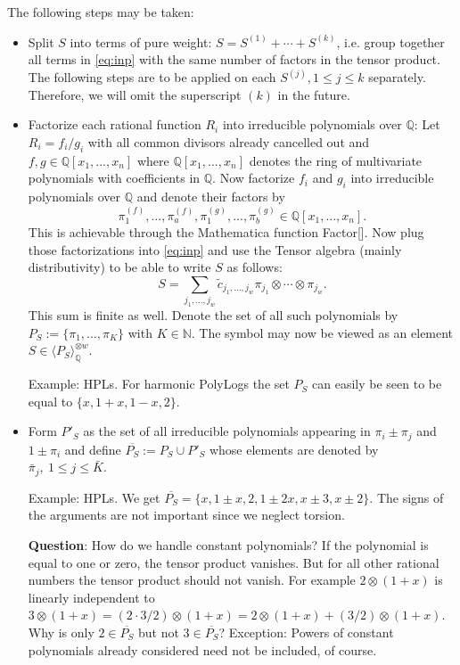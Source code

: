 \documentclass[10pt]{article}
\newcommand*{\IQ}{\mathbb{Q}}
\newcommand*{\IN}{\mathbb{N}}
\begin{document}
The following steps may be taken:
\begin{itemize}
\item[(i)] Split $S$ into terms of pure weight: $S = S^{(1)} + \cdots + S^{(k)}$, i.e. group together all terms in \ref{eq:inp} with the same number of factors in the tensor product. The following steps are to be applied on each $S^{(j)}, 1 \leq j \leq k$ separately. Therefore, we will omit the superscript $(k)$ in the future.
\item[(ii)] Factorize each rational function $R_i$ into irreducible polynomials over $\IQ$: Let $R_i = f_i/g_i$ with all common divisors already cancelled out and $f, g \in \IQ[x_1, ..., x_n]$ where $\IQ[x_1, ..., x_n]$ denotes the ring of multivariate polynomials with coefficients in $\IQ$. Now factorize $f_i$ and $g_i$ into irreducible polynomials over $\IQ$ and denote their factors by
\begin{equation*}
\pi^{(f)}_1, ..., \pi^{(f)}_a, \pi^{(g)}_1, ..., \pi^{(g)}_b \in \IQ[x_1, ..., x_n].
\end{equation*} 
This is achievable through the Mathematica function Factor[]. Now plug those factorizations into \ref{eq:inp} and use the Tensor algebra (mainly distributivity) to be able to write $S$ as follows:
\begin{equation*}
S = \sum_{j_1, ..., j_w} \tilde{c}_{j_1, ..., j_w} \pi_{j_1} \otimes \cdots \otimes \pi_{j_w}.
\end{equation*}
This sum is finite as well. Denote the set of all such polynomials by $P_S := \{\pi_1, ..., \pi_K\}$ with $K \in \IN$. The symbol may now be viewed as an element $S \in \langle P_S \rangle_{\IQ}^{\otimes w}$.

Example: HPLs. For harmonic PolyLogs the set $P_S$ can easily be seen to be equal to $\{x, 1+x, 1-x, 2\}$.

\item[(iii)] Form $P'_S$ as the set of all irreducible polynomials appearing in $\pi_i \pm \pi_j$ and $1 \pm \pi_i$ and define $\overline{P_S} := P_S \cup P'_S$ whose elements are denoted by $\bar \pi _j, \ 1 \leq j \leq \bar K$.

Example: HPLs. We get $\overline{P_S} = \{x, 1\pm x, 2, 1 \pm 2x, x \pm 3, x \pm 2\}$. The signs of the arguments are not important since we neglect torsion.

\textbf{Question}: How do we handle constant polynomials? If the polynomial is equal to one or zero, the tensor product vanishes. But for all other rational numbers the tensor product should not vanish. For example $2 \otimes (1+x)$ is linearly independent to $3 \otimes (1+x) = (2 \cdot 3/2) \otimes (1+x) = 2 \otimes (1+x) + (3/2) \otimes (1+x)$. Why is only $2 \in \overline{P_S}$ but not $3 \in \overline{P_S}$? Exception: Powers of constant polynomials already considered need not be included, of course.


\end{itemize}
\end{document}
